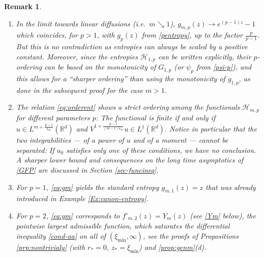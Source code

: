 \documentclass[reqno]{amsart}
\newtheorem{remark}[lemma]{Remark}
\newcommand{\R}{\mathbb{R}}
\newcommand{\Rd}{{\R^d}}
\begin{document}
%
\begin{remark}
\
\begin{enumerate}
    \item[(a)] In the limit towards linear diffusions (i.e.\ $m\searrow1$), $g_{m,p}(z) \to e^{(p-1)z}-1$ which coincides, for $p>1$, with $g_p(z)$ from \eqref{pentropy}, up to the factor $\frac{p}{p-1}$. But this is no contradiction as entropies can always be scaled by a positive constant. Moreover, since the entropies $\mathcal H_{1,p}$ can be written explicitly, their $p$-ordering can be based on the monotonicity of $G_{1,p}$ (or $\psi_p$ from \eqref{psi-p}), and this allows for a ``sharper ordering'' than using the monotonicity of $g_{1,p}$, as done in the subsequent proof for the case $m>1$.
    \item[(b)]
    The relation \eqref{eq:orderent} shows a strict ordering among the functionals $\mathcal H_{m,p}$ for different parameters $p$: The functional is finite if and only if $u\in L^{m+\frac{p-1}{\kappa_m}}(\Rd)$ and $V^{1+\frac{p-1}{(m-1)\kappa_m}}u\in L^1(\Rd)$. Notice in particular that the two integrabilities --- of a power of $u$ and of a moment --- cannot be separated: If $u_0$ satisfies only one of these conditions, we have no conclusion. 
    A sharper lower bound and consequences on the long time asymptotics of \eqref{GFP} are discussed in Section \ref{sec-funcineq}. 
    \item[(c)] For $p=1$, \eqref{eq:gm} yields the standard entropy $g_{m,1}(z)=z$ that was already introduced in Example \ref{Ex:canon-entropy}.
    \item[(d)] For $p=2$, \eqref{eq:gm} corresponds to $f'_{m,2}(z)=Y_m(z)$ (see \eqref{Ym} below), the pointwise largest admissible function, which saturates the differential inequality \eqref{cond-aa} on all of $(\xi_{\min},\infty)$, see the proofs of Propositions \ref{prp:nontrivialy} (with $r_*=0$, $z_*=\xi_{\min}$) and \ref{prop:genm}(d).
\end{enumerate}
\end{remark}
%
\end{document}
